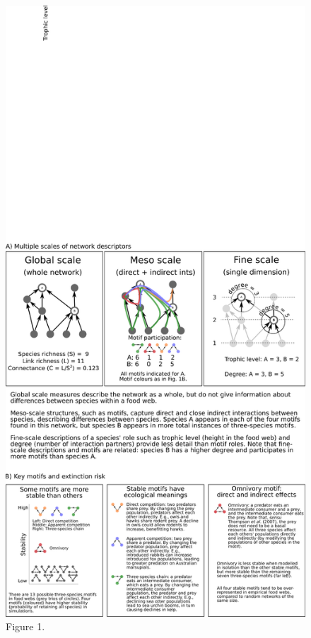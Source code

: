 \documentclass[12pt]{article}
\begin{document}
    \begin{figure}[h!]
        \includegraphics[width=.9\textwidth]{figures/motifs_box.eps}
        \caption{Figure 1.}
        \label{motifs}
    \end{figure}

    \clearpage
\end{document}
